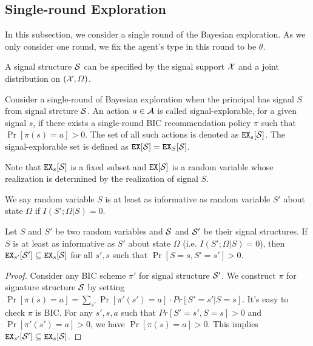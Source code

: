 \subsection{Single-round Exploration}
\label{sec:public_single}

In this subsection, we consider a single round of the Bayesian exploration. As we only consider one round, we fix the agent's type in this round to be $\theta$.

A signal structure $\S$ can be specified by the signal support $\X$ and a joint distribution on $(\X, \varOmega)$.  %
\begin{definition}
Consider a single-round of Bayesian exploration when the principal has signal $S$ from signal strcture $\S$. An action $a \in \A$ is called signal-explorable, for a given signal $s$, if there exists a single-round BIC recommendation policy $\pi$ such that $\Pr[\pi(s) = a] > 0$. The set of all such actions is denoted as $\EX_s[\S]$. The signal-explorable set is defined as $\EX[\S] = \EX_S[\S]$.
\end{definition}

Note that $\EX_s[\S]$ is a fixed subset and $\EX[\S]$ is a random variable whose realization is determined by the realization of signal $S$.

\begin{definition}
We say random variable $S$ is at least as informative as  random variable $S'$ about state $\Omega$ if $I(S' ; \Omega|S) = 0$.
\end{definition}

\begin{lemma}
\label{lem:infomono}
Let $S$ and $S'$ be two random variables and $\S$ and $\S'$ be their signal structures. If $S$ is at least as informative as $S'$ about state $\Omega$ (i.e. $I(S' ; \Omega|S) = 0$), then $\EX_{s'}[\S'] \subseteq \EX_s[\S]$ for all $s' ,s$ such that $\Pr[S= s, S'= s'] > 0$.
\end{lemma}

\begin{proof}
Consider any BIC scheme $\pi'$ for signal structure $\S'$. We construct $\pi$ for signature structure $\S$ by setting $\Pr[\pi(s) = a] = \sum_{s'} \Pr[\pi'(s') = a] \cdot Pr[S' = s'|S = s]$. It's easy to check $\pi$ is BIC. For any $s', s ,a$ such that $Pr[S' = s',S = s] >0 $ and $\Pr[\pi'(s') = a] >0$, we have $\Pr[\pi(s) = a] > 0$. This implies $\EX_{s'}[\S'] \subseteq \EX_s[\S]$.
\end{proof}

